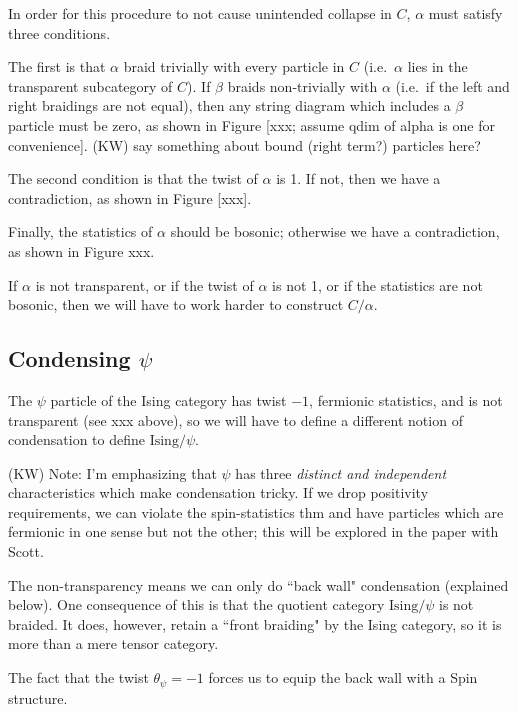 \documentclass[12pt,a4paper]{article}
\newcommand{\kw}[1]{{\color{kwcolor}\footnotesize{(KW) #1}}}
\begin{document}
In order for this procedure to not cause unintended collapse in $C$,
$\alpha$ must satisfy three conditions.

The first is that $\alpha$ braid trivially with every particle in $C$ 
(i.e.\ $\alpha$ lies in the transparent subcategory of $C$).
If $\beta$ braids non-trivially with $\alpha$ (i.e.\ if the left and right braidings are not equal),
then any string diagram which includes a $\beta$ particle must be zero, as shown in 
Figure [xxx; assume qdim of alpha is one for convenience].
\kw{say something about bound (right term?) particles here?}

The second condition is that the twist of $\alpha$ is 1.
If not, then we have a contradiction, as shown in Figure [xxx].

Finally, the statistics of $\alpha$ should be bosonic; otherwise we have a contradiction, as shown in Figure xxx.

\medskip

If $\alpha$ is not transparent, or if the twist of $\alpha$ is not 1, or if the statistics are not bosonic, then we
will have to work harder to construct $C/\alpha$.



\subsection{Condensing $\psi$} \label{condensing_psi}



The $\psi$ particle of the Ising category has twist $-1$, fermionic statistics, and is not transparent (see xxx above),
so we will have to define a different notion of condensation to define $\mbox{Ising}/\psi$.

\kw{Note: I'm emphasizing that $\psi$ has three {\it distinct and independent} characteristics which make condensation tricky.
If we drop positivity requirements, we can violate the spin-statistics thm and have particles which are fermionic in one sense but
not the other; this will be explored in the paper with Scott.}

The non-transparency means we can only do ``back wall" condensation (explained below).
One consequence of this is that the quotient category $\mbox{Ising}/\psi$ is not braided.
It does, however, retain a ``front braiding" by the Ising category, so it is more than a mere tensor category.

The fact that the twist $\theta_\psi = -1$ forces us to equip the back wall
with a Spin structure.
\end{document}
